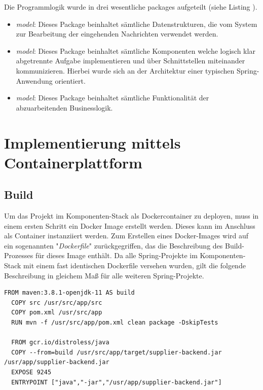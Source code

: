 Die Programmlogik wurde in drei wesentliche packages aufgeteilt (siehe Listing ). 

\begin{itemize}
  \item \emph{model}: Dieses Package beinhaltet sämtliche Datenstrukturen, die vom System zur Bearbeitung der eingehenden Nachrichten verwendet werden.
  \item \emph{model}: Dieses Package beinhaltet sämtliche Komponenten welche logisch klar abgetrennte Aufgabe implementieren und über Schnittstellen miteinander kommunizieren. Hierbei wurde sich an der Architektur einer typischen Spring-Anwendung orientiert.
  \item \emph{model}: Dieses Package beinhaltet sämtliche Funktionalität der abzuarbeitenden Businesslogik.
\end{itemize}





\section{Implementierung mittels Containerplattform}


\subsection{Build}
Um das Projekt im Komponenten-Stack als Dockercontainer zu deployen, muss in einem ersten Schritt ein Docker Image erstellt werden. Dieses kann im Anschluss als Container instanziiert werden. Zum Erstellen eines Docker-Images wird auf ein sogenannten "\emph{Dockerfile}" zurückgegriffen, das die Beschreibung des Build-Prozesses für dieses Image enthält. Da alle Spring-Projekte im Komponenten-Stack mit einem fast identischen Dockerfile versehen wurden, gilt die folgende Beschreibung in gleichem Maß für alle weiteren Spring-Projekte. 

\begin{minipage}{\linewidth}
\begin{lstlisting}[style=javaStyle,caption={Supplier - Bi Consumer},label=lst:supplierParserEndpoint]
  FROM maven:3.8.1-openjdk-11 AS build
  COPY src /usr/src/app/src
  COPY pom.xml /usr/src/app
  RUN mvn -f /usr/src/app/pom.xml clean package -DskipTests

  FROM gcr.io/distroless/java
  COPY --from=build /usr/src/app/target/supplier-backend.jar /usr/app/supplier-backend.jar
  EXPOSE 9245
  ENTRYPOINT ["java","-jar","/usr/app/supplier-backend.jar"]
\end{lstlisting}
\end{minipage}

